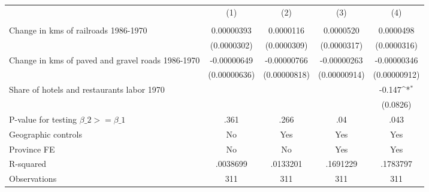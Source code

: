 {
\def\sym#1{\ifmmode^{#1}\else\(^{#1}\)\fi}
\begin{tabular}{l*{4}{c}}
\hline\hline
                &\multicolumn{1}{c}{(1)}&\multicolumn{1}{c}{(2)}&\multicolumn{1}{c}{(3)}&\multicolumn{1}{c}{(4)}\\
                &\multicolumn{1}{c}{}&\multicolumn{1}{c}{}&\multicolumn{1}{c}{}&\multicolumn{1}{c}{}\\
\hline
Change in kms of railroads 1986-1970&0.00000393         &0.0000116         &0.0000520         &0.0000498         \\
                &(0.0000302)         &(0.0000309)         &(0.0000317)         &(0.0000316)         \\
[1em]
Change in kms of paved and gravel roads 1986-1970&-0.00000649         &-0.00000766         &-0.00000263         &-0.00000346         \\
                &(0.00000636)         &(0.00000818)         &(0.00000914)         &(0.00000912)         \\
[1em]
Share of hotels and restaurants labor 1970&                  &                  &                  &   -0.147\sym{*}  \\
                &                  &                  &                  & (0.0826)         \\
\hline
P-value for testing $\beta\_{2} >= \beta\_{1}$&     .361         &     .266         &      .04         &     .043         \\
Geographic controls&       No         &      Yes         &      Yes         &      Yes         \\
Province FE     &       No         &       No         &      Yes         &      Yes         \\
R-squared       & .0038699         & .0133201         & .1691229         & .1783797         \\
Observations    &      311         &      311         &      311         &      311         \\
\hline\hline
\end{tabular}
}
